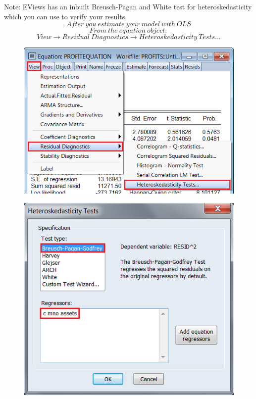 \documentclass[12pt]{report}
\begin{document}
\noindent Note: EViews has an inbuilt Breusch-Pagan and White test for heteroskedasticity which you can use to verify your results,
$$After\ you\ estimate\ your\ model\ with\ OLS$$
$$From\ the\ equation\ object:$$
$$View \to Residual\ Diagnostics \to Heteroskedasticity\ Tests... $$
\begin{figure}[H]
	\centering
	\includegraphics{tute10_6}
\end{figure}
\vspace{-\baselineskip}
\begin{figure}[H]
	\centering
	\includegraphics{q1_8}
\end{figure}
\vspace{-\baselineskip}
\end{document}
